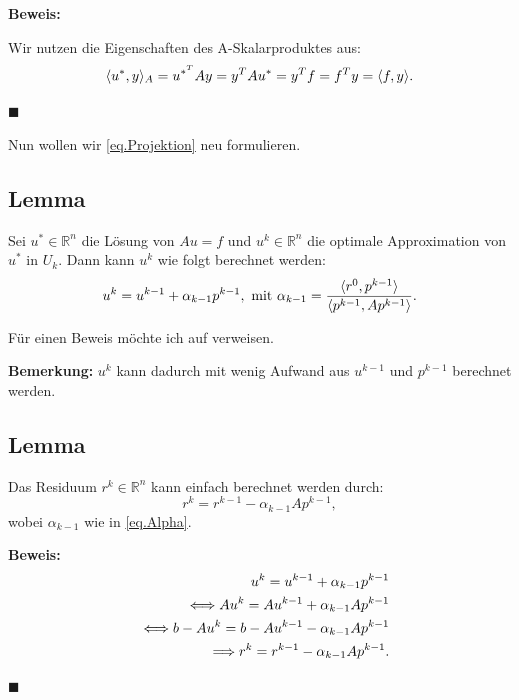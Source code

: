 \textbf{Beweis:}

Wir nutzen die Eigenschaften des A-Skalarproduktes aus:
\begin{equation}
\langle u^{*}, y \rangle _{A} = u^{{*}^{T}}Ay = y^{T}Au^{*} = y^{T}f = f^{T}y = \langle f, y \rangle. \notag
\end{equation}
\begin{flushright}
$\blacksquare$
\end{flushright}

Nun wollen wir \autoref{eq.Projektion} neu formulieren.

\subsection{Lemma}
Sei $u^{*} \in \mathbb{R}^{n}$ die Lösung von $Au = f$ und $u^{k} \in \mathbb{R}^{n}$ die optimale Approximation von $u^{*}$ in $U_{k}$. Dann kann $u^{k}$ wie folgt berechnet werden:
\begin{equation}
u^{k} = u^{k-1} + \alpha_{k-1}p^{k-1}, \textnormal{ mit } \alpha_{k-1} = \frac {\langle r^{0}, p^{k-1} \rangle} {\langle {p^{k-1}, Ap^{k-1}} \rangle}.\label{eq.Alpha}
\end{equation}

Für einen Beweis möchte ich auf \cite{DR8} verweisen.

\textbf{Bemerkung:}
$u^{k}$ kann dadurch mit wenig Aufwand aus $u^{k-1}$ und $p^{k-1}$ berechnet werden.

\subsection{Lemma}
Das Residuum $r^{k} \in \mathbb{R}^{n}$ kann einfach berechnet werden durch:
\begin{equation}
r^{k} = r^{k-1} - \alpha_{k-1}Ap^{k-1},
\end{equation}
wobei $\alpha_{k-1}$ wie in \autoref{eq.Alpha}.

\textbf{Beweis:}
\begin{eqnarray}
&&u^{k} = u^{k-1} + \alpha_{k-1}p^{k-1} \notag \\
&&\Longleftrightarrow Au^{k} = Au^{k-1} + \alpha_{k-1}Ap^{k-1} \notag \\
&&\Longleftrightarrow b - Au^{k} = b - Au^{k-1} - \alpha_{k-1}Ap^{k-1} \notag \\
&&\Longrightarrow r^{k} = r^{k-1} - \alpha_{k-1}Ap^{k-1}. \notag
\end{eqnarray}
\begin{flushright}
$\blacksquare$
\end{flushright}

